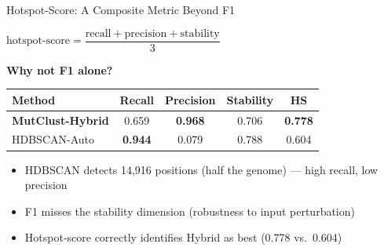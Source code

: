 \documentclass[aspectratio=169,11pt]{beamer}
\begin{document}
\begin{frame}{Hotspot-Score: A Composite Metric Beyond F1}

\begin{center}
\Large
$\text{hotspot-score} = \dfrac{\text{recall} + \text{precision} + \text{stability}}{3}$
\end{center}

\vspace{0.5em}
\textbf{Why not F1 alone?}

\begin{center}
\begin{tabular}{lcccc}
\toprule
\textbf{Method} & \textbf{Recall} & \textbf{Precision} & \textbf{Stability} & \textbf{HS} \\
\midrule
\textbf{MutClust-Hybrid} & 0.659 & \textbf{0.968} & 0.706 & \textbf{0.778} \\
HDBSCAN-Auto & \textbf{0.944} & 0.079 & 0.788 & 0.604 \\
\bottomrule
\end{tabular}
\end{center}

\vspace{0.5em}
\begin{itemize}
  \item HDBSCAN detects \alert{14,916} positions (half the genome) --- high recall, low precision
  \item F1 misses the stability dimension (robustness to input perturbation)
  \item Hotspot-score correctly identifies Hybrid as best (\alert{0.778} vs.\ 0.604)
\end{itemize}
\end{frame}
\end{document}
